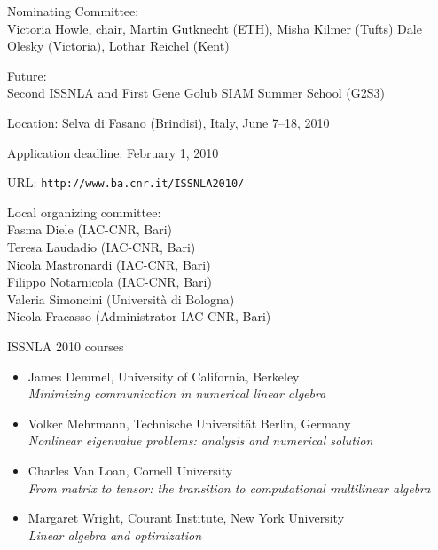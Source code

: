 \documentclass[]{seminar}
\begin{document}
{\begin{slide}
\vspace*{3mm}

{\color{blue}
Nominating Committee:}
\\
Victoria Howle, chair,
Martin Gutknecht (ETH),
Misha Kilmer (Tufts)
Dale Olesky (Victoria),
Lothar Reichel (Kent)

\end{slide}
\begin{slide}

\begin{center}
{\color{red}
Future: \\
Second ISSNLA and First Gene Golub SIAM Summer School (G2S3)
}
\end{center}

{\color{blue} Location:}
Selva di Fasano (Brindisi), Italy, June 7--18, 2010

{\color{blue} Application deadline:} February 1, 2010 

{\color{blue} URL:} \verb#http://www.ba.cnr.it/ISSNLA2010/ #

{\color{blue} Local organizing committee:} \\
Fasma Diele (IAC-CNR, Bari)\\
Teresa Laudadio (IAC-CNR, Bari)\\
Nicola Mastronardi (IAC-CNR, Bari)\\
Filippo Notarnicola (IAC-CNR, Bari)\\
Valeria Simoncini (Universit{\`a} di Bologna)\\
Nicola Fracasso (Administrator IAC-CNR, Bari)

\end{slide}
\begin{slide}

\begin{center}
{\color{red}
ISSNLA 2010 courses
}
\end{center}

\begin{itemize}
\item James Demmel, University of California, Berkeley\\
 {\em  Minimizing communication in numerical linear algebra}
\item Volker Mehrmann, Technische Universit{\"a}t Berlin, Germany\\
 {\em Nonlinear eigenvalue problems: analysis and numerical solution}
\item Charles Van Loan, Cornell University\\
    {\em From matrix to tensor: the transition to computational multilinear
algebra}
\item Margaret Wright, Courant Institute, New York University\\
     {\em Linear algebra and optimization}
\end{itemize}




\end{slide}}
\end{document}
